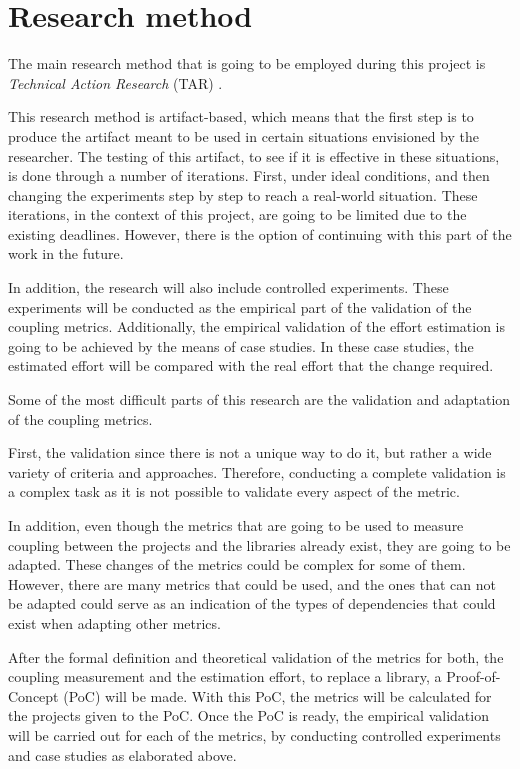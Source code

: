 \section{Research method} %
The main research method that is going to be employed during this project is \textit{Technical Action Research} (TAR) \cite{wieringa2012technical}.

This research method is artifact-based, which means that the first step is to produce the artifact meant to be used in certain situations envisioned by the researcher. The testing of this artifact, to see if it is effective in these situations, is done through a number of iterations. First, under ideal conditions, and then changing the experiments step by step to reach a real-world situation. These iterations, in the context of this project, are going to be limited due to the existing deadlines. However, there is the option of continuing with this part of the work in the future.

\bigskip\noindent
In addition, the research will also include controlled experiments. These experiments will be conducted as the empirical part of the validation of the coupling metrics. Additionally, the empirical validation of the effort estimation is going to be achieved by the means of case studies. In these case studies, the estimated effort will be compared with the real effort that the change required.

\bigskip\noindent
Some of the most difficult parts of this research are the validation and adaptation of the coupling metrics.

First, the validation since there is not a unique way to do it, but rather a wide variety of criteria and approaches. Therefore, conducting a complete validation is a complex task as it is not possible to validate every aspect of the metric.

In addition, even though the metrics that are going to be used to measure coupling between the projects and the libraries already exist, they are going to be adapted. These changes of the metrics could be complex for some of them. However, there are many metrics that could be used, and the ones that can not be adapted could serve as an indication of the types of dependencies that could exist when adapting other metrics.

\bigskip\noindent
After the formal definition and theoretical validation of the metrics for both, the coupling measurement and the estimation effort, to replace a library, a Proof-of-Concept (PoC) will be made. With this PoC, the metrics will be calculated for the projects given to the PoC. Once the PoC is ready, the empirical validation will be carried out for each of the metrics, by conducting controlled experiments and case studies as elaborated above.

